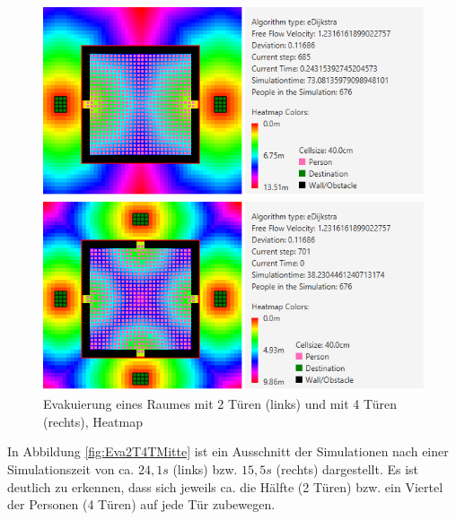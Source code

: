 \begin{figure}[!htb]
	\centering
	\begin{minipage}{.5\textwidth}
		\centering
		\includegraphics[width=\textwidth]{abbildungen/Evak2TuerenAnfangHeat.PNG}
	\end{minipage}%
	\begin{minipage}{0.5\textwidth}
		\centering
		\includegraphics[width=\textwidth]{abbildungen/Evak4TuerenAnfangHeat.PNG}
	\end{minipage}
		\caption{Evakuierung eines Raumes mit 2 Türen (links) und mit 4 Türen (rechts), Heatmap}
		\label{fig:Eva2T4THeatMap}
\end{figure}

In Abbildung \ref{fig:Eva2T4TMitte} ist ein Ausschnitt der Simulationen nach einer Simulationszeit von ca. $24,1s$ (links) bzw. $15,5s$ (rechts) dargestellt. Es ist deutlich zu erkennen, dass sich jeweils ca. die Hälfte (2 Türen) bzw. ein Viertel der Personen (4 Türen) auf jede Tür zubewegen. 

